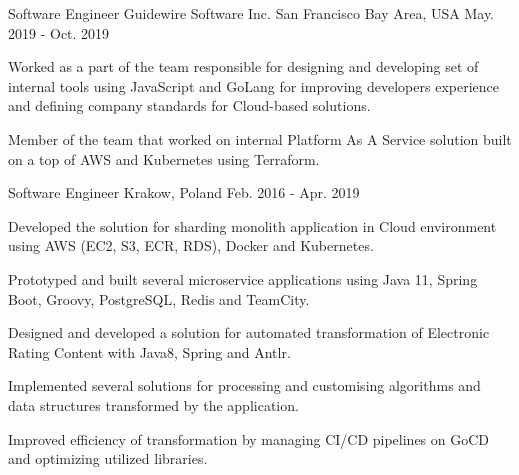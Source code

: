 

\begin{cventries}

  \cventry
    {Software Engineer} %
    {Guidewire Software Inc.} %
    {San Francisco Bay Area, USA} %
    {May. 2019 - Oct. 2019} %
    {
      \begin{cvitems} %
        \item {Worked as a part of the team responsible for designing and developing set of internal tools using JavaScript and GoLang for improving developers experience and defining company standards for Cloud-based solutions.	}
        \item {Member of the team that worked on internal Platform As A Service solution built on a top of AWS and Kubernetes using Terraform. }
      \end{cvitems}
    }

  \cventry
    {Software Engineer} %
    { } %
    {Krakow, Poland} %
    {Feb. 2016 - Apr. 2019} %
    {
      \begin{cvitems} %
        \item {Developed the solution for sharding monolith application in Cloud environment using AWS (EC2, S3, ECR, RDS), Docker and Kubernetes.}
        \item {Prototyped and built several microservice applications using Java 11, Spring Boot, Groovy, PostgreSQL, Redis and TeamCity.}
        \item {Designed and developed a solution for automated transformation of Electronic Rating Content with Java8, Spring and Antlr.}
        \item {Implemented several solutions for processing and customising algorithms and data structures transformed by the application.}
        \item {Improved efficiency of transformation by managing CI/CD pipelines on GoCD and optimizing utilized libraries.}
      \end{cvitems}
    }


\end{cventries}
